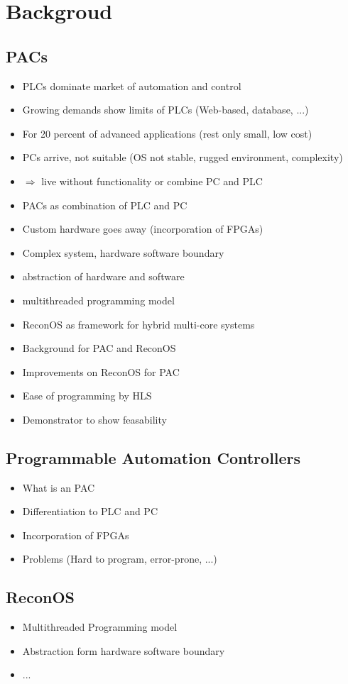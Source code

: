 \chapter{Backgroud}
\section{\aclp{PAC}}
\begin{itemize}
\item \acp{PLC} dominate market of automation and control
\item Growing demands show limits of \acp{PLC} (Web-based, database, ...)
\item For 20 percent of advanced applications (rest only small, low cost)
\item PCs arrive, not suitable (OS not stable, rugged environment, complexity)
\item $\Rightarrow$ live without functionality or combine PC and PLC
\item \acp{PAC} as combination of PLC and PC
\item Custom hardware goes away (incorporation of FPGAs)
\item Complex system, hardware software boundary
\item abstraction of hardware and software
\item multithreaded programming model
\item ReconOS as framework for hybrid multi-core systems
\end{itemize}


\begin{itemize}
\item Background for PAC and ReconOS
\item Improvements on ReconOS for PAC
\item Ease of programming by HLS
\item Demonstrator to show feasability
\end{itemize}


\section{Programmable Automation Controllers}
\begin{itemize}
\item What is an PAC
\item Differentiation to PLC and PC
\item Incorporation of FPGAs
\item Problems (Hard to program, error-prone, ...)
\end{itemize}
\section{ReconOS}
\begin{itemize}
\item Multithreaded Programming model
\item Abstraction form hardware software boundary
\item ...
\end{itemize}